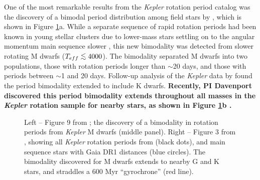 \documentclass[12pt]{article}
\newcommand{\Kepler}{\textsl{Kepler}\xspace}
\def\lesssim{\mathrel{\hbox{\rlap{\hbox{\lower3pt\hbox{$\sim$}}}\hbox{\raise2pt\hbox{$<$}}}}}
\begin{document}
One of the most remarkable results from the \Kepler rotation period catalog was the discovery of a bimodal period distribution among field stars by \citet{mcquillan2013}, which is shown in Figure \ref{fig:bimodal}a. While a separate sequence of rapid rotation periods had been known in young stellar clusters due to lower-mass stars settling on to the angular momentum main sequence slower \citep[e.g.][]{barnes2007}, this new bimodality was detected from slower rotating M dwarfs ($T_{eff}\lesssim4000$). The bimodality separated M dwarfs into two populations, those with rotation periods longer than $\sim$20 days, and those with periods between $\sim$1 and 20 days. Follow-up analysis of the \Kepler data by \citet{mcquillan2014} found the period bimodality extended to include K dwarfs. {\bf Recently, PI Davenport discovered this period bimodality extends throughout all masses in the \Kepler rotation sample for nearby stars, as shown in Figure \ref{fig:bimodal}b \citep{davenport2017}.}

\begin{figure}[!th]
\centering
{}
\caption{
Left -- Figure 9 from \citet{mcquillan2013}; the discovery of a bimodality in rotation periods from \Kepler M dwarfs (middle panel).
Right -- Figure 3 from \citet{davenport2017}, showing all \Kepler rotation periods from \citet{mcquillan2014} (black dots), and main sequence stars with Gaia DR1 distances (blue circles). The bimodality discovered for M dwarfs extends to nearby G and K stars, and straddles a 600 Myr ``gyrochrone'' (red line).
}
\label{fig:bimodal}
\end{figure}
\end{document}
